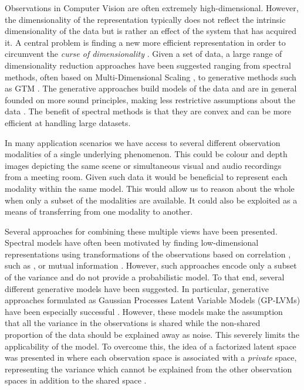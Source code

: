 Observations in Computer Vision are often extremely
high-dimensional. However, the dimensionality of the representation typically
does not reflect the intrinsic dimensionality of the data but is rather an effect of
the system that has acquired it. A central problem is finding
a new more efficient representation in order to circumvent
the \emph{curse of dimensionality} \cite{bellman1957dynamic}. Given a
set of data, a large range of dimensionality reduction approaches have
been suggested ranging from spectral methods, often based on
Multi-Dimensional Scaling \cite{Cox:2008uv}, to generative methods such
as GTM \cite{Bishop:1998fl}. The generative approaches build models
of the data and are in general founded on more sound principles, making
less restrictive assumptions about the data \cite{Ek:2009vv}. The
benefit of spectral methods is that they are 
convex and can be more efficient at handling large datasets.

In many application scenarios we have access to several different
observation modalities of a single underlying phenomenon. This could
be colour and depth images depicting the same scene or simultaneous
visual and audio recordings from a meeting room.  Given such data it
would be beneficial to represent each modality within the same
model. This would allow us to reason about the whole when only a
subset of the modalities are available. It could also be exploited as
a means of transferring from one modality to another.

Several 
approaches for combining these multiple views have been presented. 
Spectral models have often
been motivated by finding low-dimensional representations using
transformations of the observations based on correlation
\cite{Kuss:2003wp}, such as \cite{Ham:2005vs}, or mutual information
\cite{Memisevic:2011tq}. However, such approaches encode only a
subset of the variance and do not provide a probabilistic model. To that end,
several different generative models have been suggested.
In particular, %
generative approaches formulated as Gaussian Processes Latent Variable Models
(GP-LVMs) \cite{Lawrence:2005vk} have been especially successful
\cite{Shon:2006wr,Ek:2007uo}.
 However, these models make the
assumption that all the variance in the observations is shared while
the non-shared proportion of the data should be explained away as
noise. This severely limits the applicability of the
model. To overcome this, the idea of a factorized latent space was
presented in \cite{Ek:2008up} where each observation space is
associated with a \emph{private} space, representing the variance which
cannot be explained from the other observation spaces in addition to
the shared space \cite{Ek:2009vv}.

